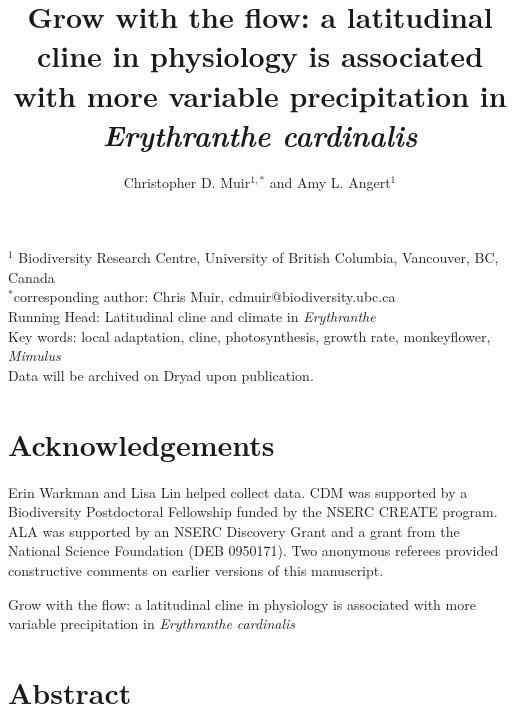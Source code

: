\documentclass[11pt, oneside]{article}
\title{Grow with the flow: a latitudinal cline in physiology is associated with more variable precipitation in \textit{Erythranthe cardinalis}}
\author{Christopher D. Muir$^{1,*}$ and Amy L. Angert$^1$}
\date{}
\newcommand{\stretchy}{1.5}
\begin{document}

\maketitle

$^1$ Biodiversity Research Centre, University of British Columbia, Vancouver, BC, Canada \\
$^*$corresponding author: Chris Muir, cdmuir@biodiversity.ubc.ca \\

Running Head: Latitudinal cline and climate in \textit{Erythranthe} \\

Key words: local adaptation, cline, photosynthesis, growth rate, monkeyflower, \textit{Mimulus} \\

Data will be archived on Dryad upon publication. \\


\section*{Acknowledgements}
Erin Warkman and Lisa Lin helped collect data. CDM was supported by a Biodiversity Postdoctoral Fellowship funded by the NSERC CREATE program. ALA was supported by an NSERC Discovery Grant and a grant from the National Science Foundation (DEB 0950171). Two anonymous referees provided constructive comments on earlier versions of this manuscript.

\clearpage

\setstretch{\stretchy}

\begin{center}
{\LARGE  \centering Grow with the flow: a latitudinal cline in physiology is associated with more variable precipitation in \textit{Erythranthe cardinalis}}
\end{center}

\section*{Abstract}
\end{document}
